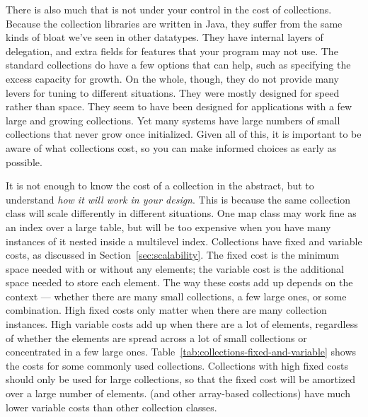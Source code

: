 There is also much that is not under your control in the cost
of collections.
Because the collection libraries are written in Java, they suffer
from the same kinds of bloat we've seen in other datatypes. They have
internal layers of delegation, and extra fields for features that your program may not use. The standard
collections do have a few options that can help, such as
specifying the excess capacity for growth. On the whole, though, they do not
provide many levers for tuning to different situations. They were mostly
designed for speed rather than space.  They seem to have been designed for
applications with a few large and growing collections. Yet many systems have large numbers
of small collections that never grow once initialized. Given all of this, it is important
to be aware of what collections cost, so you can make informed choices as early as possible. 

It is not enough to know the cost of a collection in the abstract, but to
understand \emph{how it will work in your design}. This is because the same
collection class will scale differently in
different situations. One map class may work fine as an index over
a large table, but will be too expensive when you have many instances of it
nested inside a multilevel index. Collections have fixed and
variable costs, as discussed in Section~\ref{sec:scalability}. 
The fixed cost is the minimum space needed with or
without any elements; the variable cost is the additional space needed to
store each element. The way these costs add up
depends on the context ---
whether there are many small collections, a few large ones, or some
combination. High fixed costs only matter when there are many
collection instances. High variable costs add up when
there are a lot of elements, regardless of whether the elements are spread across a lot of small collections
or concentrated in a few large ones.
Table~\ref{tab:collections-fixed-and-variable} shows the costs for some commonly
used collections.  Collections with high fixed costs should only be used for
large collections, so that the fixed cost will be amortized over a large number
of elements.  (and other array-based collections) have
much lower variable costs than other collection classes.

